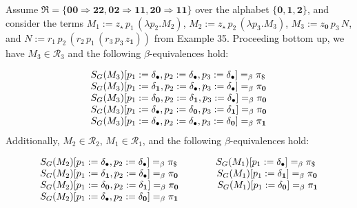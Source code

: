 Assume $\mathfrak{R}=\{\mathbf{0}\mathbf{0}\Rightarrow\mathbf{2}\mathbf{2},\mathbf{0}%
\mathbf{2}\Rightarrow\mathbf{1}\mathbf{1},\mathbf{2}\mathbf{0}\Rightarrow%
\mathbf{1}\mathbf{1}\}$ over the alphabet $\{\mathbf{0},\mathbf{1},\mathbf{2}\}$, and consider the terms $M_{1}:=z_{\star}\,p_{1}\,(\lambda p_{2}.M_{2})$, $M_{2}:=z_{\star}\,p_{2}\,(\lambda p_{3}.M_{3})$, $M_{3}:=z_{\mathbf{0}}\,p_{3}\,N$, and $N:=r_{1}\,p_{2}\,(r_{2}\,p_{1}\,(r_{3}\,p_{3}\,z_{\mathbf{1}}))$ from Example 35. Proceeding bottom up, we have $M_{3}\in\mathcal{R}_{3}$ and the following $\beta$-equivalences hold:\par
    \[\begin{array}[]{l}S_{G}(M_{3})[p_{1}:=\delta_{\bullet},p_{2}:=\delta_{\bullet}%
,p_{3}:=\delta_{\bullet}]=_{\beta}\pi_{\$}\\
S_{G}(M_{3})[p_{1}:=\delta_{\mathbf{1}},p_{2}:=\delta_{\bullet},p_{3}:=\delta_%
{\bullet}]=_{\beta}\pi_{\mathbf{0}}\\
S_{G}(M_{3})[p_{1}:=\delta_{\mathbf{0}},p_{2}:=\delta_{\mathbf{1}},p_{3}:=%
\delta_{\bullet}]=_{\beta}\pi_{\mathbf{0}}\\
S_{G}(M_{3})[p_{1}:=\delta_{\bullet},p_{2}:=\delta_{\mathbf{0}},p_{3}:=\delta_%
{\mathbf{1}}]=_{\beta}\pi_{\mathbf{0}}\\
S_{G}(M_{3})[p_{1}:=\delta_{\bullet},p_{2}:=\delta_{\bullet},p_{3}:=\delta_{%
\mathbf{0}}]=_{\beta}\pi_{\mathbf{1}}\end{array}\]    
Additionally, $M_{2}\in\mathcal{R}_{2}$, $M_{1}\in\mathcal{R}_{1}$, and the following $\beta$-equivalences hold:\par
    \[\begin{array}[]{l}S_{G}(M_{2})[p_{1}:=\delta_{\bullet},p_{2}:=\delta_{\bullet}%
]=_{\beta}\pi_{\$}\qquad\qquad S_{G}(M_{1})[p_{1}:=\delta_{\bullet}]=_{\beta}%
\pi_{\$}\\
S_{G}(M_{2})[p_{1}:=\delta_{\mathbf{1}},p_{2}:=\delta_{\bullet}]=_{\beta}\pi_{%
\mathbf{0}}\qquad\qquad S_{G}(M_{1})[p_{1}:=\delta_{\mathbf{1}}]=_{\beta}\pi_{%
\mathbf{0}}\\
S_{G}(M_{2})[p_{1}:=\delta_{\mathbf{0}},p_{2}:=\delta_{\mathbf{1}}]=_{\beta}%
\pi_{\mathbf{0}}\qquad\qquad S_{G}(M_{1})[p_{1}:=\delta_{\mathbf{0}}]=_{\beta}%
\pi_{\mathbf{1}}\\
S_{G}(M_{2})[p_{1}:=\delta_{\bullet},p_{2}:=\delta_{\mathbf{0}}]=_{\beta}\pi_{%
\mathbf{1}}\end{array}\]    
 
 
